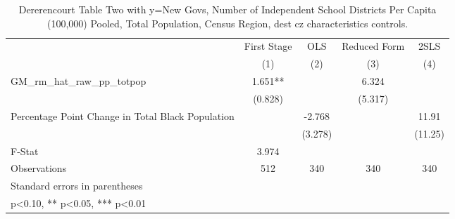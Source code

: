 \begin{table}[htbp]\centering
\def\sym#1{\ifmmode^{#1}\else\(^{#1}\)\fi}
\caption{Dererencourt Table Two with y=New Govs, Number of Independent School Districts Per Capita (100,000) Pooled, Total Population, Census Region, dest cz characteristics controls.}
\begin{tabular}{l*{4}{c}}
\toprule
                    & First Stage   &         OLS   &Reduced Form   &        2SLS   \\
                    &\multicolumn{1}{c}{(1)}   &\multicolumn{1}{c}{(2)}   &\multicolumn{1}{c}{(3)}   &\multicolumn{1}{c}{(4)}   \\
\midrule
GM\_rm\_hat\_raw\_pp\_totpop&       1.651** &               &       6.324   &               \\
                    &     (0.828)   &               &     (5.317)   &               \\
\addlinespace
Percentage Point Change in Total Black Population&               &      -2.768   &               &       11.91   \\
                    &               &     (3.278)   &               &     (11.25)   \\
\midrule
F-Stat              &       3.974   &               &               &               \\
Observations        &         512   &         340   &         340   &         340   \\
\bottomrule
\multicolumn{5}{l}{\footnotesize Standard errors in parentheses}\\
\multicolumn{5}{l}{\footnotesize * p<0.10, ** p<0.05, *** p<0.01}\\
\end{tabular}
\end{table}

